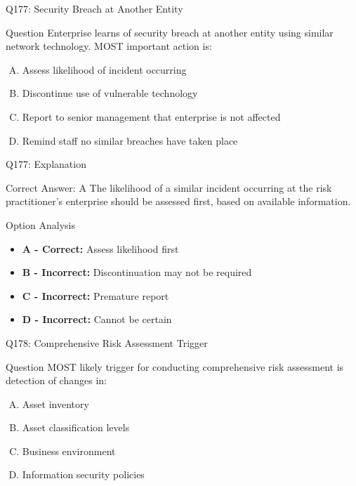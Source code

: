 \documentclass{beamer}
\begin{document}
	\begin{frame}{Q177: Security Breach at Another Entity}
		\begin{block}{Question}
			Enterprise learns of security breach at another entity using similar network technology. MOST important action is:
		\end{block}
		\begin{enumerate}[(A)]
			\item Assess likelihood of incident occurring
			\item Discontinue use of vulnerable technology
			\item Report to senior management that enterprise is not affected
			\item Remind staff no similar breaches have taken place
		\end{enumerate}
	\end{frame}
	
	\begin{frame}{Q177: Explanation}
		\begin{block}{Correct Answer: A}
			The likelihood of a similar incident occurring at the risk practitioner's enterprise should be assessed first, based on available information.
		\end{block}
		\begin{block}{Option Analysis}
			\begin{itemize}
				\item \textbf{A - Correct:} Assess likelihood first
				\item \textbf{B - Incorrect:} Discontinuation may not be required
				\item \textbf{C - Incorrect:} Premature report
				\item \textbf{D - Incorrect:} Cannot be certain
			\end{itemize}
		\end{block}
	\end{frame}
	
	\begin{frame}{Q178: Comprehensive Risk Assessment Trigger}
		\begin{block}{Question}
			MOST likely trigger for conducting comprehensive risk assessment is detection of changes in:
		\end{block}
		\begin{enumerate}[(A)]
			\item Asset inventory
			\item Asset classification levels
			\item Business environment
			\item Information security policies
		\end{enumerate}
	\end{frame}
	
\end{document}
